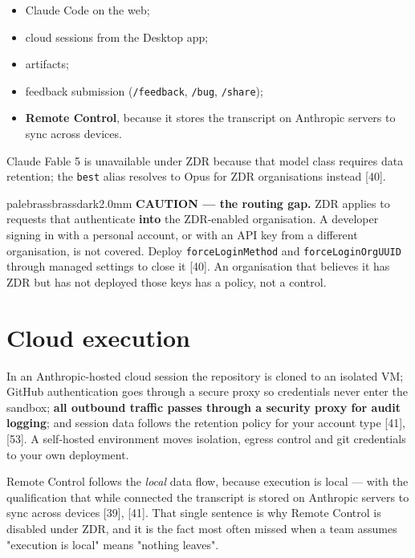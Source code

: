 \documentclass[11pt,a4paper,twoside,openany]{book}
\begin{document}
\begin{itemize}
\item Claude Code on the web;
\item cloud sessions from the Desktop app;
\item artifacts;
\item feedback submission (\texttt{/\allowbreak{}feedback}, \texttt{/\allowbreak{}bug}, \texttt{/\allowbreak{}share});
\item \textbf{Remote Control}, because it stores the transcript on Anthropic servers to sync across devices.
\end{itemize}

Claude Fable 5 is unavailable under ZDR because that model class requires data retention; the \texttt{best} alias resolves to Opus for ZDR organisations instead [40].


\begin{calloutbox}{palebrass}{brassdark}{2.0mm}
\textbf{CAUTION — the routing gap.} ZDR applies to requests that authenticate \textbf{into} the ZDR-enabled organisation. A developer signing in with a personal account, or with an API key from a different organisation, is not covered. Deploy \texttt{force\allowbreak{}Login\allowbreak{}Method} and \texttt{force\allowbreak{}Login\allowbreak{}Org\allowbreak{}UUID} through managed settings to close it [40]. An organisation that believes it has ZDR but has not deployed those keys has a policy, not a control.
\end{calloutbox}

\FloatBarrier
\setcounter{section}{3}
\section{Cloud execution}

In an Anthropic-hosted cloud session the repository is cloned to an isolated VM; GitHub authentication goes through a secure proxy so credentials never enter the sandbox; \textbf{all outbound traffic passes through a security proxy for audit logging}; and session data follows the retention policy for your account type [41], [53]. A self-hosted environment moves isolation, egress control and git credentials to your own deployment.


Remote Control follows the \emph{local} data flow, because execution is local — with the qualification that while connected the transcript is stored on Anthropic servers to sync across devices [39], [41]. That single sentence is why Remote Control is disabled under ZDR, and it is the fact most often missed when a team assumes "execution is local" means "nothing leaves".
\end{document}
